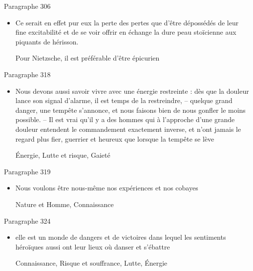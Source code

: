 \documentclass[french,a4paper,11pt,answers]{exam}
\newcommand{\cit}[2]{\og #1 \fg{} \begin{solution}{ #2 }\end{solution}} %
\begin{document}
	\begin{cadre}{Paragraphe 306}
		\begin{itemize}
			\item \cit{Ce serait en effet pur eux la perte des pertes que d'être dépossédés de leur fine excitabilité et de se voir offrir en échange la dure peau stoïcienne aux piquants de hérisson.}
				{Pour Nietzsche, il est préférable d'être épicurien}
		\end{itemize}
	\end{cadre}
	
	\begin{cadre}{Paragraphe 318}
		\begin{itemize}
			\item \cit{Nous devons aussi savoir vivre avec une énergie restreinte : dès que la douleur lance son signal d'alarme, il est temps de la restreindre, -- quelque grand danger, une tempête s'annonce, et nous faisons bien de nous \og gonfler \fg{} le moins possible. -- Il est vrai qu'il y a des hommes qui à l'approche d'une grande douleur entendent le commandement exactement inverse, et n'ont jamais le regard plus fier, guerrier et heureux que lorsque la tempête se lève}
				{Énergie, Lutte et risque, Gaieté}
		\end{itemize}
	\end{cadre}

	\begin{cadre}{Paragraphe 319}
		\begin{itemize}
			\item \cit{Nous voulons être nous-même nos expériences et nos cobayes}
				{Nature et Homme, Connaissance}
		\end{itemize}
	\end{cadre}
	
	\begin{cadre}{Paragraphe 324}
		\begin{itemize}
			\item \cit{elle est un monde de dangers et de victoires dans lequel les sentiments héroïques aussi ont leur lieux où danser et s'ébattre}
				{Connaissance, Risque et souffrance, Lutte, Énergie}
		\end{itemize}
	\end{cadre}
	
\end{document}

